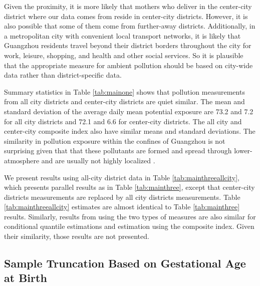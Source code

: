 Given the proximity, it is more likely that mothers who deliver in the center-city district where our data comes from reside in center-city districts. However, it is also possible that some of them come from further-away districts. Additionally, in a metropolitan city with convenient local transport networks, it is likely that Guangzhou residents travel beyond their district borders throughout the city for work, leisure, shopping, and health and other social services. So it is plausible that the appropriate measure for ambient pollution should be based on city-wide data rather than district-specific data. 

Summary statistics in Table \ref{tab:mainone} shows that pollution measurements from all city districts and center-city districts are quiet similar. The mean and standard deviation of the average daily mean potential \PARPMTEN exposure are 73.2 and 7.2 for all city districts and 72.1 and 6.6 for center-city districts. The all city and center-city composite index also have similar means and standard deviations. The similarity in pollution exposure within the confines of Guangzhou is not surprising given that that these pollutants are formed and spread through lower-atmosphere and are usually not highly localized \autocite{he_severe_2019}. 

We present results using all-city district data in Table \ref{tab:mainthreeallcity}, which presents parallel results as in Table \ref{tab:mainthree}, except that center-city districts \PARPMTEN measurements are replaced by all city districts measurements. Table \ref{tab:mainthreeallcity} estimates are almost identical to Table \ref{tab:mainthree} results. Similarly, results from using the two types of measures are also similar for conditional quantile estimations and estimation using the composite index. Given their similarity, those results are not presented. 



\subsection{Sample Truncation Based on Gestational Age at Birth\label{sec:appfullterm}}

